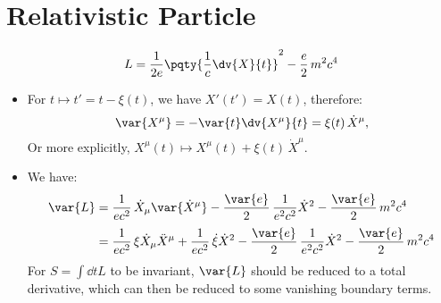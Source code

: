 \documentclass[a4paper,10pt]{article}
\begin{document}
\section{Relativistic Particle}
	\vspace{-.3\baselineskip}
	\begin{equation}
		L = \frac{1}{2e} \pqty{
			\frac{1}{c}\dv{X}{t}
		}^2 - \frac{e}{2}\,m^2 c^4
	\end{equation}
	\begin{itemize}
	\item For $t\mapsto t' = t - \xi(t)$, we have $
		X'(t') = X(t)
	$, therefore:
	\begin{equation}
		\var{X^\mu}
		= -\var{t} \dv{X^\mu}{t}
		= \xi(t)\,\dot{X}^\mu,
	\end{equation}
	Or more explicitly, $
		X^\mu(t)
		\mapsto X^\mu(t) + \xi(t)\,\dot{X}^\mu
	$. 
	
	
	\item We have:
	\begin{equation}
	\begin{aligned}
		\var{{L}}
		&= \frac{1}{ec^2}\,
				\dot{X}_\mu
				\var{\dot{X}^\mu}
			- \frac{\var{e}}{2}\,
				\frac{1}{e^2 c^2} \dot{X}^2
			- \frac{\var{e}}{2}\,m^2 c^4 \\[.5ex]
		&= \frac{1}{ec^2}\,
				\xi\dot{X}_\mu\ddot{X}^\mu
			+ \frac{1}{ec^2}\,
				\dot{\xi}\dot{X}^2
			- \frac{\var{e}}{2}\,
				\frac{1}{e^2 c^2} \dot{X}^2
			- \frac{\var{e}}{2}\,m^2 c^4
	\end{aligned}
	\end{equation}
	For $
		S = \int\dd{t} {{L}}
	$ to be invariant, $\var{{L}}$ should be reduced to a total derivative, which can then be reduced to some vanishing boundary terms. 
	

\end{itemize}
\end{document}

